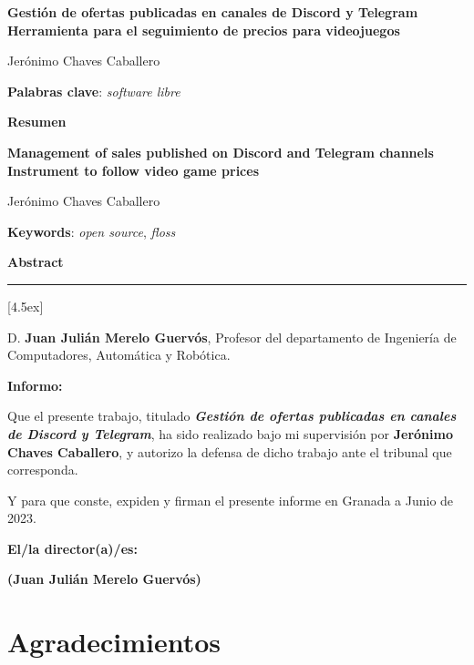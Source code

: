 \thispagestyle{empty}

\begin{center}
{\large\bfseries Gestión de ofertas publicadas en canales de Discord y Telegram \\ Herramienta para el seguimiento de precios para videojuegos }\\
\end{center}
\begin{center}
Jerónimo Chaves Caballero\\
\end{center}


\vspace{0.5cm}
\noindent\textbf{Palabras clave}: \textit{software libre}
\vspace{0.7cm}

\noindent\textbf{Resumen}
	

\cleardoublepage

\begin{center}
	{\large\bfseries Management of sales published on Discord and Telegram channels \\ Instrument to follow video game prices}\\
\end{center}
\begin{center}
	Jerónimo Chaves Caballero\\
\end{center}
\vspace{0.5cm}
\noindent\textbf{Keywords}: \textit{open source}, \textit{floss}
\vspace{0.7cm}

\noindent\textbf{Abstract}


\cleardoublepage

\thispagestyle{empty}

\noindent\rule[-1ex]{\textwidth}{2pt}[4.5ex]

D. \textbf{Juan Julián Merelo Guervós}, Profesor del  departamento de Ingeniería de Computadores, Automática y Robótica.

\vspace{0.5cm}

\textbf{Informo:}

\vspace{0.5cm}

Que el presente trabajo, titulado \textit{\textbf{Gestión de ofertas publicadas en canales de Discord y Telegram}},
ha sido realizado bajo mi supervisión por \textbf{Jerónimo Chaves Caballero}, y autorizo la defensa de dicho trabajo ante el tribunal
que corresponda.

\vspace{0.5cm}

Y para que conste, expiden y firman el presente informe en Granada a Junio de 2023.

\vspace{1cm}

\textbf{El/la director(a)/es: }

\vspace{5cm}

\noindent \textbf{(Juan Julián Merelo Guervós)}

\chapter*{Agradecimientos}




